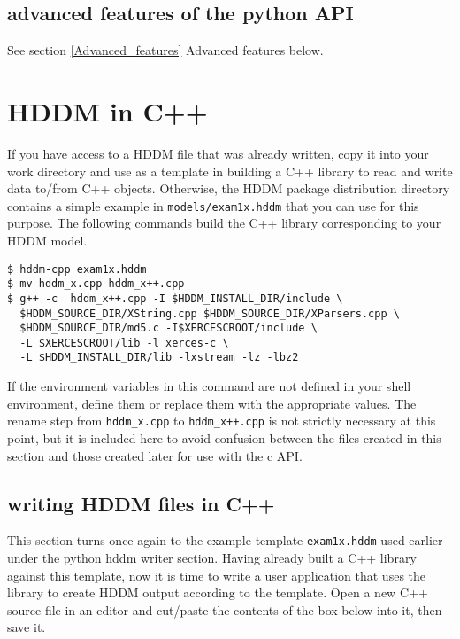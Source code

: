 \documentclass{revtex4}
\begin{document}
\subsection{advanced features of the python API}

See section \ref{Advanced_features} {Advanced features} below.

\section{HDDM in C++}

If you have access to a HDDM file that was already written, copy it into your
work directory and use as a template in building a C++ library to read and
write data to/from C++  objects. Otherwise, the HDDM package distribution
directory contains a simple example in \texttt{models/exam1x.hddm} that you
can use for this purpose. The following commands build the C++ library
corresponding to your HDDM model.

\vspace{0.5cm}
\begin{minipage}{12cm}
\begin{verbatim}
$ hddm-cpp exam1x.hddm
$ mv hddm_x.cpp hddm_x++.cpp
$ g++ -c  hddm_x++.cpp -I $HDDM_INSTALL_DIR/include \
  $HDDM_SOURCE_DIR/XString.cpp $HDDM_SOURCE_DIR/XParsers.cpp \
  $HDDM_SOURCE_DIR/md5.c -I$XERCESCROOT/include \
  -L $XERCESCROOT/lib -l xerces-c \
  -L $HDDM_INSTALL_DIR/lib -lxstream -lz -lbz2
\end{verbatim}
\end{minipage}
\vspace{0.5cm}

If the environment variables in this command are not defined in your shell
environment, define them or replace them with the appropriate values.
The rename step from \texttt{hddm\_x.cpp} to \texttt{hddm\_x++.cpp} is not
strictly necessary at this point, but it is included here to avoid confusion
between the files created in this section and those created later for use
with the c API.

\subsection{writing HDDM files in C++}

This section turns once again to the example template \texttt{exam1x.hddm} used
earlier under the python hddm writer section. Having already built a C++ library
against this template, now it is time to write a user application that uses the
library to create HDDM output according to the template. Open a new C++ source
file in an editor and cut/paste the contents of the box below into it, then save it.
\end{document}

